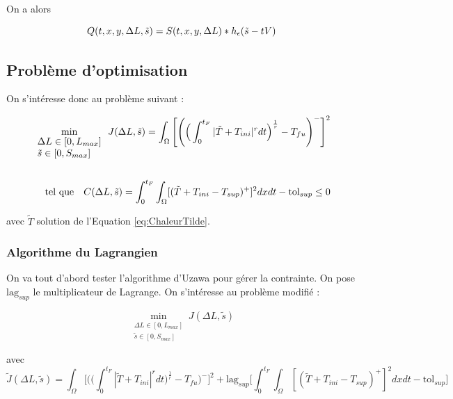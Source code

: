 \documentclass[11pt,a4paper]{article}
\begin{document}
On a alors 

\begin{equation}
Q(t,x,y,\Delta L,\tilde{s})=S(t,x,y,\Delta L)*h_{\epsilon}(\tilde{s}-tV)
\end{equation}  


\subsection*{Problème d'optimisation}

On s'intéresse donc au problème suivant :

\begin{equation*}
\label{eq:pbOptim}
\begin{aligned}
\min_{\begin{array}{l}
	\Delta L\in[0,L_{max}] \\
	\tilde{s}\in [0,S_{max}]
	\end{array}} J(\Delta L,\tilde{s})=\int_{\Omega}\Bigg[\Bigg(\Big(\int_{0}^{t_F}|\tilde{T}+T_{ini}|^rdt\Big)^{\frac{1}{r}}-T_{fu}\Bigg)^-\Bigg]^2 \\
\\
\textrm{tel\,\,que\quad} C(\Delta L,\tilde{s})=\int_{0}^{t_F}\int_{\Omega}[(\tilde{T}+T_{ini}-T_{sup})^+]^2dxdt-\textrm{tol}_{sup}\leq 0
\end{aligned}
\end{equation*}

avec $\tilde T$ solution de l'Equation \ref{eq:ChaleurTilde}.

\vspace{0cm}

\subsubsection*{Algorithme du Lagrangien}

On va tout d'abord tester l'algorithme d'Uzawa pour gérer la contrainte. On pose $\textrm{lag}_{sup}$ le multiplicateur de Lagrange. On s'intéresse au problème modifié :

\begin{equation}
\min_{\begin{array}{l}
	\Delta L\in[0,L_{max}] \\
	\tilde{s}\in [0,S_{max}]
	\end{array}} J(\Delta L,\tilde{s})
\end{equation}

avec 
\begin{equation}
\tilde{J}(\Delta L,\tilde{s})=\int_{\Omega}\Bigg[\Bigg(\Big(\int_{0}^{t_F}|\tilde{T}+T_{ini}|^rdt\Big)^{\frac{1}{r}}-T_{fu}\Bigg)^-\Bigg]^2+\textrm{lag}_{sup} \Bigg[\int_{0}^{t_F}\int_{\Omega}[(\tilde{T}+T_{ini}-T_{sup})^+]^2dxdt-\textrm{tol}_{sup}\Bigg]
\end{equation}
\end{document}
